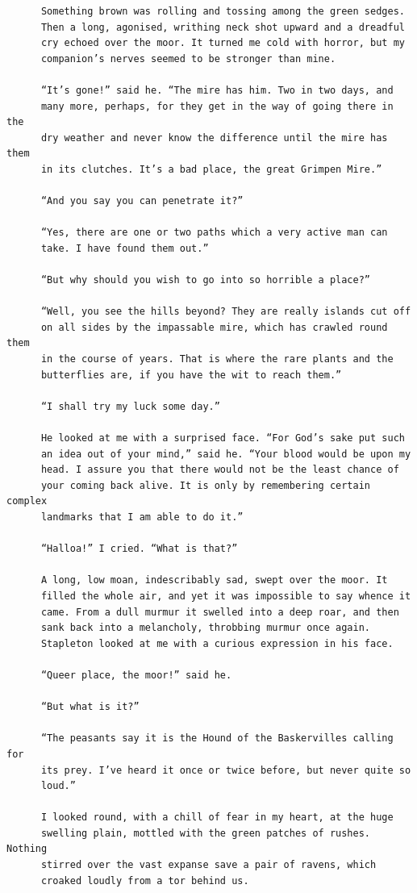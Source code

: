 \documentclass{article}
\begin{document}
\begin{verbatim}
      Something brown was rolling and tossing among the green sedges.
      Then a long, agonised, writhing neck shot upward and a dreadful
      cry echoed over the moor. It turned me cold with horror, but my
      companion’s nerves seemed to be stronger than mine.

      “It’s gone!” said he. “The mire has him. Two in two days, and
      many more, perhaps, for they get in the way of going there in the
      dry weather and never know the difference until the mire has them
      in its clutches. It’s a bad place, the great Grimpen Mire.”

      “And you say you can penetrate it?”

      “Yes, there are one or two paths which a very active man can
      take. I have found them out.”

      “But why should you wish to go into so horrible a place?”

      “Well, you see the hills beyond? They are really islands cut off
      on all sides by the impassable mire, which has crawled round them
      in the course of years. That is where the rare plants and the
      butterflies are, if you have the wit to reach them.”

      “I shall try my luck some day.”

      He looked at me with a surprised face. “For God’s sake put such
      an idea out of your mind,” said he. “Your blood would be upon my
      head. I assure you that there would not be the least chance of
      your coming back alive. It is only by remembering certain complex
      landmarks that I am able to do it.”

      “Halloa!” I cried. “What is that?”

      A long, low moan, indescribably sad, swept over the moor. It
      filled the whole air, and yet it was impossible to say whence it
      came. From a dull murmur it swelled into a deep roar, and then
      sank back into a melancholy, throbbing murmur once again.
      Stapleton looked at me with a curious expression in his face.

      “Queer place, the moor!” said he.

      “But what is it?”

      “The peasants say it is the Hound of the Baskervilles calling for
      its prey. I’ve heard it once or twice before, but never quite so
      loud.”

      I looked round, with a chill of fear in my heart, at the huge
      swelling plain, mottled with the green patches of rushes. Nothing
      stirred over the vast expanse save a pair of ravens, which
      croaked loudly from a tor behind us.


\end{verbatim}
\end{document}

